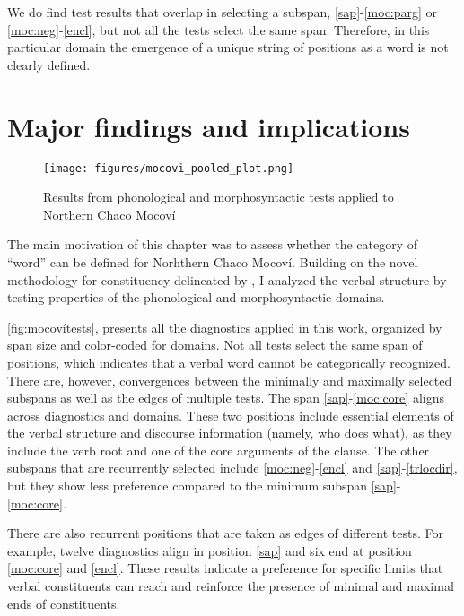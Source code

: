 \documentclass[output=paper]{langscibook}
\begin{document}
We do find test results that overlap in selecting a subspan, \ref{sap}-\ref{moc:parg} or \ref{moc:neg}-\ref{encl}, but not all the tests select the same span. Therefore, in this particular domain the emergence of a unique string of positions as a word is not clearly  defined. 


\section{Major findings and implications} \label{sec:finalremarks}

\begin{figure}[b]
    \centering
   \texttt{[image: figures/mocovi\_pooled\_plot.png]}
    \caption{Results from phonological and morphosyntactic tests applied to Northern Chaco Mocoví}
    \label{fig:mocovítests}
\end{figure}

The main motivation of this chapter was to assess whether the category of ``word'' can be defined for Norhthern Chaco Mocoví. Building on the novel methodology for constituency delineated by \citet{Tallman2020}, I analyzed the verbal structure by testing properties of the phonological and morphosyntactic domains.

\autoref{fig:mocovítests}, presents all the diagnostics applied in this work, organized by span size and color-coded for domains. Not all tests select the same span of positions, which indicates that a verbal word cannot be categorically recognized. There are, however, convergences between the minimally and maximally selected subspans as well as the edges of multiple tests. The span \ref{sap}-\ref{moc:core} aligns across diagnostics and domains. These two positions include essential elements of the verbal structure and discourse information (namely, who does what), as they include the verb root and one of the core arguments of the clause. The other subspans that are recurrently selected include \ref{moc:neg}-\ref{encl} and \ref{sap}-\ref{trlocdir}, but they show less preference compared to the minimum subspan \ref{sap}-\ref{moc:core}.



There are also recurrent positions that are taken as edges of different tests. For example, twelve diagnostics align in position \ref{sap} and six end at position \ref{moc:core} and \ref{encl}. These results indicate a preference for specific limits that verbal constituents can reach and reinforce the presence of minimal and maximal ends of constituents.  
\end{document}
